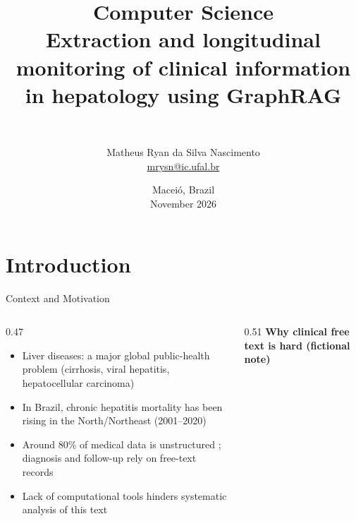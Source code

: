 \documentclass[9pt]{beamer}
\title{
{\large\color{blue!60!black}\textbf{Computer Science}}\\[0.8em]
Extraction and longitudinal \\
monitoring of clinical information\\
in hepatology using GraphRAG
}
\subtitle{\,}
\author{
Matheus Ryan da Silva Nascimento\\
{\footnotesize\cascadia\href{mailto:mrysn@ic.ufal.br}{mrysn@ic.ufal.br}}}
\date{
Maceió, Brazil\\
November 2026
}
\begin{document}
    \maketitle

    \section{Introduction}

    \begin{frame}{Context and Motivation}
        \begin{columns}[T,totalwidth=0.95\textwidth]
            \begin{column}{0.47\textwidth}
                \small
                \begin{itemize}
                    \itemsep2pt
                    \item Liver diseases: a major global public-health problem (cirrhosis, viral hepatitis, hepatocellular carcinoma) \cite{sousa2023}
                    \item In Brazil, chronic hepatitis mortality has been rising in the North/Northeast (2001--2020) \cite{sousa2023}
                    \item Around 80\% of medical data is unstructured \cite{kong2019}; diagnosis and follow-up rely on free-text records \cite{schneider2023}
                    \item Lack of computational tools hinders systematic analysis of this text \cite{hou2014}
                \end{itemize}
            \end{column}
            \begin{column}{0.51\textwidth}
                \centering
                {\scriptsize\bfseries Why clinical free text is hard (fictional note)}\par\vskip3pt
                
            \end{column}
        \end{columns}
    \end{frame}
\end{document}
